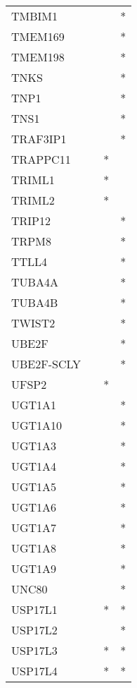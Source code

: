 \begin{longtable}{lccc}
TMBIM1         &       &    &       * \\
TMEM169        &       &    &       * \\
TMEM198        &       &    &       * \\
TNKS           &       &    &       * \\
TNP1           &       &    &       * \\
TNS1           &       &    &       * \\
TRAF3IP1       &       &    &       * \\
TRAPPC11       &       &  * &         \\
TRIML1         &       &  * &         \\
TRIML2         &       &  * &         \\
TRIP12         &       &    &       * \\
TRPM8          &       &    &       * \\
TTLL4          &       &    &       * \\
TUBA4A         &       &    &       * \\
TUBA4B         &       &    &       * \\
TWIST2         &       &    &       * \\
UBE2F          &       &    &       * \\
UBE2F-SCLY     &       &    &       * \\
UFSP2          &       &  * &         \\
UGT1A1         &       &    &       * \\
UGT1A10        &       &    &       * \\
UGT1A3         &       &    &       * \\
UGT1A4         &       &    &       * \\
UGT1A5         &       &    &       * \\
UGT1A6         &       &    &       * \\
UGT1A7         &       &    &       * \\
UGT1A8         &       &    &       * \\
UGT1A9         &       &    &       * \\
UNC80          &       &    &       * \\
USP17L1        &       &  * &       * \\
USP17L2        &       &    &       * \\
USP17L3        &       &  * &       * \\
USP17L4        &       &  * &       * \\

\end{longtable}

